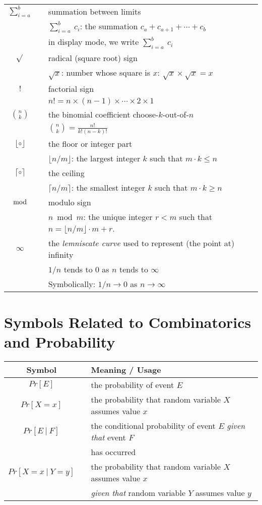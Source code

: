 \begin{tabular}{c|cl}
$\displaystyle \sum_{i=a}^b$
  & & summation between limits \\
  & & $\sum_{i=a}^b \ c_i$: the summation $c_a + c_{a+1} + \cdots + c_b$ \\
  & & in display mode, we write $\displaystyle \sum_{i=a}^b \ c_i$  \\ \hline
$\sqrt{}$
  & & radical (square root) sign \\
  & & $\sqrt{x}$: number whose square is $x$: $\sqrt{x} \times \sqrt{x} = x$ \\ \hline
$!$
  & & factorial sign \\
  & & $n! = n \times (n-1) \times \cdots \times 2 \times 1$ \\ \hline
$\displaystyle {n \choose k}$ 
  & & the binomial coefficient choose-$k$-out-of-$n$ \\
  & & $\displaystyle {n \choose k} = \frac{n!}{k! (n-k)!}$ \\ \hline
$\lfloor \circ \rfloor$
  & & the floor or integer part \\
  & & $\lfloor n/m \rfloor$: the largest integer $k$ such that $m \cdot k \leq n$ \\ \hline
$\lceil \circ \rceil$
  & & the ceiling \\
  & & $\lceil n/m \rceil$: the smallest integer $k$ such that $m \cdot k \geq n$ \\ \hline
$\bmod$
  & & modulo sign\\
  & & $n \bmod m$: the unique integer $r < m$ such that $n =  \lfloor n/m \rfloor \cdot m + r$. \\ \hline
$\infty$
  & & the {\it lemniscate curve} used to represent (the point at) infinity \\
  & & $1/n$ tends to $0$ as $n$ tends to $\infty$ \\
  & & Symbolically: $1/n \rightarrow 0$ as $n \rightarrow \infty$ \\ \hline
\end{tabular}

\section*{Symbols Related to Combinatorics and Probability}

\begin{tabular}{c|cl}
{\bf Symbol} & & {\bf Meaning} / {\bf Usage} \\ \hline
\hline
$Pr[E]$
  & & the probability of event $E$ \\ \hline
$Pr[X=x]$
  & & the probability that random variable $X$ assumes value $x$ \\ \hline
$Pr[E \ | \ F]$
  &  & the conditional probability of event $E$ {\em given that} event $F$ \\
  &  & has occurred \\ \hline
$Pr[X=x \ | \ Y=y]$
  & & the probability that random variable $X$ assumes value $x$ \\
  & & {\em given that} random variable $Y$ assumes value $y$ \\ \hline
\end{tabular}


